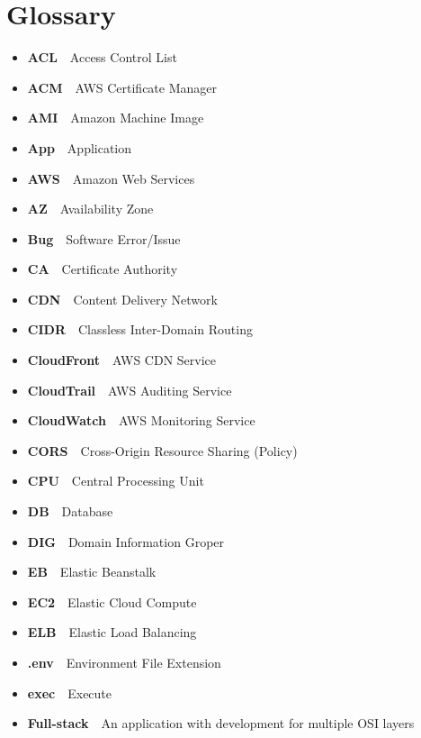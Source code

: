 \beforeabstract
\afterabstract
\chapter{Glossary}\label{ch:glossary}

\begin{itemize}
    \item  \textbf{ACL}~\textemdash~Access Control List
    \item  \textbf{ACM}~\textemdash~AWS Certificate Manager
    \item  \textbf{AMI}~\textemdash~Amazon Machine Image
    \item  \textbf{App}~\textemdash~Application
    \item  \textbf{AWS}~\textemdash~Amazon Web Services
    \item  \textbf{AZ}~\textemdash~Availability Zone
    \item  \textbf{Bug}~\textemdash~Software Error/Issue
    \item  \textbf{CA}~\textemdash~Certificate Authority
    \item  \textbf{CDN}~\textemdash~Content Delivery Network
    \item  \textbf{CIDR}~\textemdash~Classless Inter-Domain Routing
    \item  \textbf{CloudFront}~\textemdash~AWS CDN Service
    \item  \textbf{CloudTrail}~\textemdash~AWS Auditing Service
    \item  \textbf{CloudWatch}~\textemdash~AWS Monitoring Service
    \item  \textbf{CORS}~\textemdash~Cross-Origin Resource Sharing (Policy)
    \item  \textbf{CPU}~\textemdash~Central Processing Unit
    \item  \textbf{DB}~\textemdash~Database
    \item  \textbf{DIG}~\textemdash~Domain Information Groper
    \item  \textbf{EB}~\textemdash~Elastic Beanstalk
    \item  \textbf{EC2}~\textemdash~Elastic Cloud Compute
    \item  \textbf{ELB}~\textemdash~Elastic Load Balancing
    \item  \textbf{.env}~\textemdash~Environment File Extension
    \item  \textbf{exec}~\textemdash~Execute
    \item  \textbf{Full-stack}~\textemdash~An application with development for multiple OSI layers

\end{itemize}
